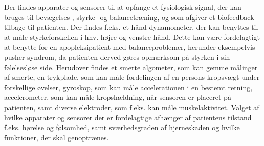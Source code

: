 Der findes apparater og sensorer til at opfange et fysiologisk signal, der kan bruges til bevægelses-, styrke- og balancetræning, og som afgiver et biofeedback tilbage til patienten. Der findes f.eks. et hånd dynamometer, der kan benyttes til at måle styrkeforskellen i hhv. højre og venstre hånd. Dette kan være fordelagtigt at benytte for en apopleksipatient med balanceproblemer, herunder eksempelvis pusher-syndrom, da patienten derved gøres opmærksom på styrken i sin følelsesløse side. Herudover findes et smerte algometer, som kan gemme målinger af smerte, en trykplade, som kan måle fordelingen af en persons kropsvægt under forskellige øvelser, gyroskop, som kan måle accelerationen i en bestemt retning, accelerometer, som kan måle kropshældning, når sensoren er placeret på patienten, samt diverse elektroder, som f.eks. kan måle muskelaktivitet. Valget af hvilke apparater og sensorer der er fordelagtige afhænger af patientens tilstand f.eks. hørelse og følsomhed, samt sværhedsgraden af hjerneskaden og hvilke funktioner, der skal genoptrænes. \cite{Hjaelpemiddelbasen} %



